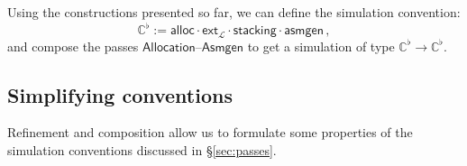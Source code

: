 \documentclass[sigplan,10pt,review,anonymous]{acmart}
\newcommand{\kw}[1]{\ensuremath{ \mathsf{#1} }}
\begin{document}
Using the constructions presented so far,
we can define the simulation convention:
\[
    \mathbb{C}^\flat :=
      \kw{alloc} \cdot
      \kw{ext}_\mathcal{L} \cdot
      \kw{stacking} \cdot
      \kw{asmgen} \,,
\]
and compose the passes \kw{Allocation}--\kw{Asmgen}
to get a simulation of type
$\mathbb{C}^\flat \rightarrow \mathbb{C}^\flat$.

%
%
%


\subsection{Simplifying conventions} %

Refinement and composition allow us to formulate
some properties of the simulation conventions
discussed in \S\ref{sec:passes}.
\end{document}
